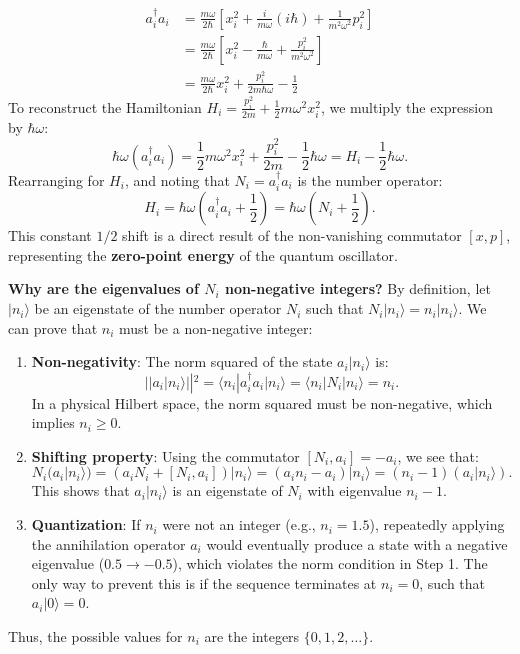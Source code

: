 \begin{solution}
\[\begin{aligned}
a_i^\dagger a_i &= \frac{m\omega}{2\hbar} \left[ x_i^2 + \frac{i}{m\omega} (i\hbar) + \frac{1}{m^2\omega^2} p_i^2 \right] \\
&= \frac{m\omega}{2\hbar} \left[ x_i^2 - \frac{\hbar}{m\omega} + \frac{p_i^2}{m^2\omega^2} \right] \\
&= \frac{m\omega}{2\hbar} x_i^2 + \frac{p_i^2}{2m\hbar\omega} - \frac{1}{2}
\end{aligned} \]
To reconstruct the Hamiltonian $H_i = \frac{p_i^2}{2m} + \frac{1}{2}m\omega^2 x_i^2$, we multiply the expression by $\hbar\omega$:
\[ \hbar\omega (a_i^\dagger a_i) = \frac{1}{2}m\omega^2 x_i^2 + \frac{p_i^2}{2m} - \frac{1}{2}\hbar\omega = H_i - \frac{1}{2}\hbar\omega. \]
Rearranging for $H_i$, and noting that $N_i = a_i^\dagger a_i$ is the number operator:
\[ H_i = \hbar\omega \left( a_i^\dagger a_i + \frac{1}{2} \right) = \hbar\omega \left( N_i + \frac{1}{2} \right). \]
This constant $1/2$ shift is a direct result of the non-vanishing commutator $[x, p]$, representing the \textbf{zero-point energy} of the quantum oscillator.

\textbf{Why are the eigenvalues of $N_i$ non-negative integers?}
By definition, let $|n_i\rangle$ be an eigenstate of the number operator $N_i$ such that $N_i |n_i\rangle = n_i |n_i\rangle$. We can prove that $n_i$ must be a non-negative integer:
\begin{enumerate}
    \item \textbf{Non-negativity}: The norm squared of the state $a_i |n_i\rangle$ is:
    \[ || a_i |n_i\rangle ||^2 = \langle n_i | a_i^\dagger a_i | n_i \rangle = \langle n_i | N_i | n_i \rangle = n_i. \]
    In a physical Hilbert space, the norm squared must be non-negative, which implies $n_i \geq 0$.
    \item \textbf{Shifting property}: Using the commutator $[N_i, a_i] = -a_i$, we see that:
    \[ N_i (a_i |n_i\rangle) = (a_i N_i + [N_i, a_i]) |n_i\rangle = (a_i n_i - a_i) |n_i\rangle = (n_i - 1) (a_i |n_i\rangle). \]
    This shows that $a_i |n_i\rangle$ is an eigenstate of $N_i$ with eigenvalue $n_i - 1$.
    \item \textbf{Quantization}: If $n_i$ were not an integer (e.g., $n_i = 1.5$), repeatedly applying the annihilation operator $a_i$ would eventually produce a state with a negative eigenvalue ($0.5 \to -0.5$), which violates the norm condition in Step 1. The only way to prevent this is if the sequence terminates at $n_i = 0$, such that $a_i |0\rangle = 0$.
\end{enumerate}
Thus, the possible values for $n_i$ are the integers $\{0, 1, 2, \dots\}$.


\end{solution}
